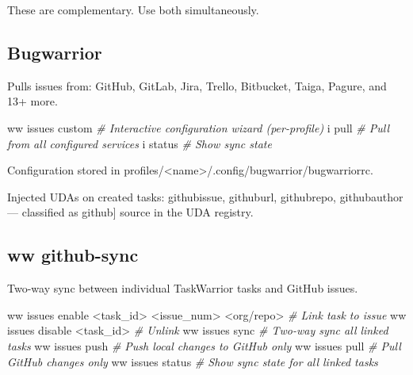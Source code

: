 \documentclass[11pt, a4paper, DIV=14]{scrartcl}
\renewcommand{\texttt}[1]{{\ttfamily\fontsize{8.5}{10.5}\selectfont\color{BabbNavy}#1}}
\newenvironment{Shaded}{%
  \vspace{4pt}%
  \begin{lrbox}{\ShadedBox}%
  \begin{minipage}{\dimexpr\linewidth-2\fboxsep\relax}%
  \vspace{4pt}%
}{%
  \vspace{4pt}%
  \end{minipage}%
  \end{lrbox}%
  \noindent\colorbox{CodeBg}{\usebox{\ShadedBox}}%
  \par\vspace{4pt}%
}
\newcommand{\CommentTok}[1]{\textcolor{BabbGray}{\textit{#1}}}
\newcommand{\ExtensionTok}[1]{#1}
\newcommand{\NormalTok}[1]{#1}
\newcommand{\OperatorTok}[1]{#1}
\newenvironment{Highlighting}{\ttfamily\fontsize{8.2}{11}\selectfont}{}
\begin{document}
These are complementary. Use both simultaneously.

\subsection{Bugwarrior}\label{bugwarrior}

Pulls issues from: GitHub, GitLab, Jira, Trello, Bitbucket, Taiga,
Pagure, and 13+ more.

\begin{Shaded}
\begin{Highlighting}[]
\ExtensionTok{ww}\NormalTok{ issues custom          }\CommentTok{\# Interactive configuration wizard (per{-}profile)}
\ExtensionTok{i}\NormalTok{ pull                    }\CommentTok{\# Pull from all configured services}
\ExtensionTok{i}\NormalTok{ status                  }\CommentTok{\# Show sync state}
\end{Highlighting}
\end{Shaded}

Configuration stored in
\texttt{profiles/\textless{}name\textgreater{}/.config/bugwarrior/bugwarriorrc}.

Injected UDAs on created tasks: \texttt{githubissue},
\texttt{githuburl}, \texttt{githubrepo}, \texttt{githubauthor} ---
classified as \texttt{{[}github{]}} source in the UDA registry.

\subsection{ww github-sync}\label{ww-github-sync}

Two-way sync between individual TaskWarrior tasks and GitHub issues.

\begin{Shaded}
\begin{Highlighting}[]
\ExtensionTok{ww}\NormalTok{ issues enable }\OperatorTok{\textless{}}\NormalTok{task\_id}\OperatorTok{\textgreater{}} \OperatorTok{\textless{}}\NormalTok{issue\_num}\OperatorTok{\textgreater{}} \OperatorTok{\textless{}}\NormalTok{org/repo}\OperatorTok{\textgreater{}}    \CommentTok{\# Link task to issue}
\ExtensionTok{ww}\NormalTok{ issues disable }\OperatorTok{\textless{}}\NormalTok{task\_id}\OperatorTok{\textgreater{}}                          \CommentTok{\# Unlink}
\ExtensionTok{ww}\NormalTok{ issues sync                                        }\CommentTok{\# Two{-}way sync all linked tasks}
\ExtensionTok{ww}\NormalTok{ issues push                                        }\CommentTok{\# Push local changes to GitHub only}
\ExtensionTok{ww}\NormalTok{ issues pull                                        }\CommentTok{\# Pull GitHub changes only}
\ExtensionTok{ww}\NormalTok{ issues status                                      }\CommentTok{\# Show sync state for all linked tasks}
\end{Highlighting}
\end{Shaded}
\end{document}
